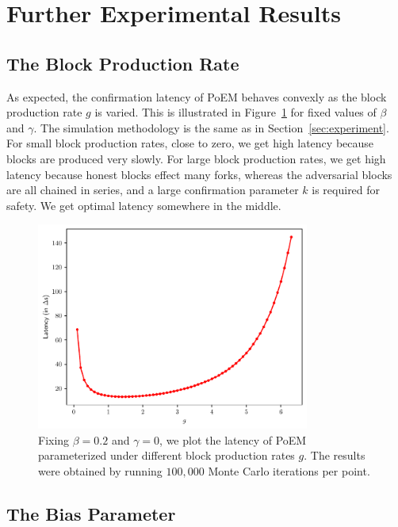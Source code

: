 \section{Further Experimental Results}\label{sec:more-experiments}

\subsection{The Block Production Rate}

As expected, the confirmation latency of PoEM behaves convexly as the block production rate $g$ is varied.
This is illustrated in Figure~\ref{fig:g_latency} for fixed values of $\beta$ and $\gamma$.
The simulation methodology is the same as in Section~\ref{sec:experiment}.
For small block production rates, close to zero, we get high latency because blocks are produced very slowly.
For large block production rates, we get high latency because honest blocks effect many forks, whereas the adversarial blocks
are all chained in series, and a large confirmation parameter $k$ is required for safety.
We get optimal latency somewhere in the middle.

\begin{figure}[pt]
  \centering
  \includegraphics[width = 0.8\textwidth]{figures/g_latency.pdf}

  \caption{Fixing $\beta=0.2$ and $\gamma=0$, we plot the latency of PoEM parameterized under different block production rates $g$.
           The results were obtained by running $100{,}000$ Monte Carlo iterations per point.}
  \label{fig:g_latency}
\end{figure}

\subsection{The Bias Parameter}

